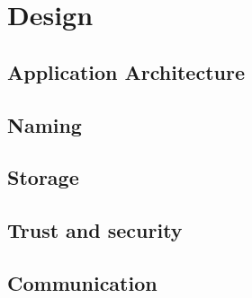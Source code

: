 \section{Design}

\subsection{Application Architecture}
\subsection{Naming}
\subsection{Storage}
\subsection{Trust and security}
\subsection{Communication}
